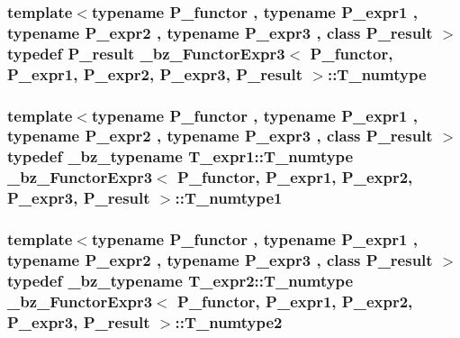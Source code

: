 \subsubsection[{T\+\_\+numtype}]{\setlength{\rightskip}{0pt plus 5cm}template$<$typename P\+\_\+functor , typename P\+\_\+expr1 , typename P\+\_\+expr2 , typename P\+\_\+expr3 , class P\+\_\+result $>$ typedef P\+\_\+result {\bf \+\_\+bz\+\_\+\+Functor\+Expr3}$<$ P\+\_\+functor, P\+\_\+expr1, P\+\_\+expr2, P\+\_\+expr3, P\+\_\+result $>$\+::{\bf T\+\_\+numtype}}\label{class__bz__FunctorExpr3_ad90a6f210859e4b689cd783be74ee748}
\hypertarget{class__bz__FunctorExpr3_a2a31b2f206352c04bcd70c865006f0f2}{}
\subsubsection[{T\+\_\+numtype1}]{\setlength{\rightskip}{0pt plus 5cm}template$<$typename P\+\_\+functor , typename P\+\_\+expr1 , typename P\+\_\+expr2 , typename P\+\_\+expr3 , class P\+\_\+result $>$ typedef {\bf \+\_\+bz\+\_\+typename} T\+\_\+expr1\+::\+T\+\_\+numtype {\bf \+\_\+bz\+\_\+\+Functor\+Expr3}$<$ P\+\_\+functor, P\+\_\+expr1, P\+\_\+expr2, P\+\_\+expr3, P\+\_\+result $>$\+::{\bf T\+\_\+numtype1}}\label{class__bz__FunctorExpr3_a2a31b2f206352c04bcd70c865006f0f2}
\hypertarget{class__bz__FunctorExpr3_ac979a99f1789411afc3ee245ea556883}{}
\subsubsection[{T\+\_\+numtype2}]{\setlength{\rightskip}{0pt plus 5cm}template$<$typename P\+\_\+functor , typename P\+\_\+expr1 , typename P\+\_\+expr2 , typename P\+\_\+expr3 , class P\+\_\+result $>$ typedef {\bf \+\_\+bz\+\_\+typename} T\+\_\+expr2\+::\+T\+\_\+numtype {\bf \+\_\+bz\+\_\+\+Functor\+Expr3}$<$ P\+\_\+functor, P\+\_\+expr1, P\+\_\+expr2, P\+\_\+expr3, P\+\_\+result $>$\+::{\bf T\+\_\+numtype2}}\label{class__bz__FunctorExpr3_ac979a99f1789411afc3ee245ea556883}
\hypertarget{class__bz__FunctorExpr3_a4eb514374e523dd1aec4be33e908e31a}{}
